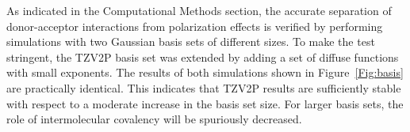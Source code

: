\documentclass[aps,prl,reprint,amsmath,amssymb]{revtex4-1}
\begin{document}
As indicated in the Computational Methods section, the accurate separation of donor-acceptor interactions from polarization effects is verified by performing simulations with two Gaussian basis sets of different sizes. 
To make the test stringent, the TZV2P basis set was extended by adding a set of diffuse functions with small exponents. 
The results of both simulations shown in Figure~\ref{Fig:basis} are practically identical. 
This indicates that TZV2P results are sufficiently stable with respect to a moderate increase in the basis set size. 
For larger basis sets, the role of intermolecular covalency will be spuriously decreased.

\fi %


\end{document}
